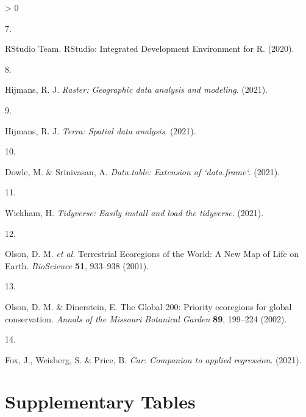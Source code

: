 \documentclass[
]{article}
\newlength{\cslhangindent}
\newlength{\csllabelwidth}
\newenvironment{CSLReferences}[2] %
 {%
  \setlength{\parindent}{0pt}
  \ifodd #1 \everypar{\setlength{\hangindent}{\cslhangindent}}\ignorespaces\fi
  \ifnum #2 > 0
  \setlength{\parskip}{#2\baselineskip}
  \fi
 }%
 {}
\newcommand{\CSLLeftMargin}[1]{\parbox[t]{\csllabelwidth}{#1}}
\newcommand{\CSLRightInline}[1]{\parbox[t]{\linewidth - \csllabelwidth}{#1}\break}
\begin{document}
\begin{CSLReferences}{0}{0}
\leavevmode\hypertarget{ref-RStudio}{}%
\CSLLeftMargin{7. }
\CSLRightInline{RStudio Team. {RStudio: Integrated Development Environment for R}. (2020).}

\leavevmode\hypertarget{ref-R-raster}{}%
\CSLLeftMargin{8. }
\CSLRightInline{Hijmans, R. J. \emph{Raster: Geographic data analysis and modeling}. (2021).}

\leavevmode\hypertarget{ref-R-terra}{}%
\CSLLeftMargin{9. }
\CSLRightInline{Hijmans, R. J. \emph{Terra: Spatial data analysis}. (2021).}

\leavevmode\hypertarget{ref-R-data.table}{}%
\CSLLeftMargin{10. }
\CSLRightInline{Dowle, M. \& Srinivasan, A. \emph{Data.table: Extension of `data.frame`}. (2021).}

\leavevmode\hypertarget{ref-R-tidyverse}{}%
\CSLLeftMargin{11. }
\CSLRightInline{Wickham, H. \emph{Tidyverse: Easily install and load the tidyverse}. (2021).}

\leavevmode\hypertarget{ref-Olson2001}{}%
\CSLLeftMargin{12. }
\CSLRightInline{Olson, D. M. \emph{et al.} {Terrestrial Ecoregions of the World: A New Map of Life on Earth}. \emph{BioScience} \textbf{51}, 933--938 (2001).}

\leavevmode\hypertarget{ref-Olson2002}{}%
\CSLLeftMargin{13. }
\CSLRightInline{Olson, D. M. \& Dinerstein, E. {The Global 200: Priority ecoregions for global conservation}. \emph{Annals of the Missouri Botanical Garden} \textbf{89}, 199--224 (2002).}

\leavevmode\hypertarget{ref-R-car}{}%
\CSLLeftMargin{14. }
\CSLRightInline{Fox, J., Weisberg, S. \& Price, B. \emph{Car: Companion to applied regression}. (2021).}

\end{CSLReferences}

\newpage

\hypertarget{supplementary-tables}{%
\section{Supplementary Tables}\label{supplementary-tables}}
\end{document}
